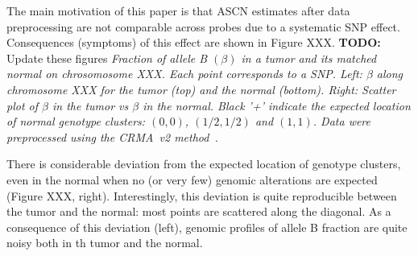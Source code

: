 \documentclass[10pt]{bmc_article}
\newenvironment{bmcformat}{\fussy\setboolean{publ}{true}}{\fussy}
\newenvironment{TODO}{\color{red}\textbf{TODO:}}{}
\begin{document}
\begin{bmcformat}
The main motivation of this paper is that ASCN estimates after data preprocessing are not comparable across probes due to a systematic SNP effect. Consequences (symptoms) of this effect are shown in Figure XXX. 
\begin{TODO}
Update these figures
\end{TODO}
\emph{Fraction of allele B $(\beta)$ in a tumor and its matched normal on chrosomosome XXX. Each point corresponds to a SNP. Left: $\beta$  along chromosome XXX for the tumor (top) and the normal (bottom). Right: Scatter plot of $\beta$ in the tumor vs $\beta$ in the normal. Black '+' indicate the expected location of normal genotype clusters: $(0,0)$, $(1/2,1/2)$ and $(1,1)$. Data were preprocessed using the CRMA~v2 method~\cite{BengtssonH_etal_2009b}.
}

There is considerable deviation from the expected location of genotype clusters, even in the normal when no (or very few) genomic alterations are expected (Figure XXX, right). Interestingly, this deviation is quite reproducible between the tumor and the normal: most points are scattered along the diagonal. As a consequence of this deviation (left), genomic profiles of allele B fraction are quite noisy both in th tumor and the normal. 


\end{bmcformat}
\end{document}
